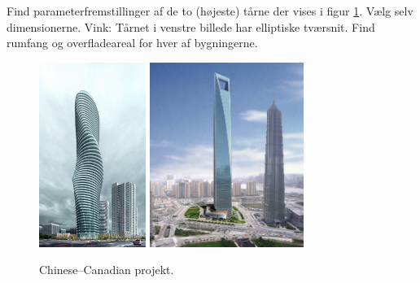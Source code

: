\begin{exercise}
Find parameterfremstillinger af de to (højeste) tårne der vises i figur \ref{figChinaCanada}.
Vælg selv dimensionerne. Vink: Tårnet i venstre billede har elliptiske tværsnit.
Find rumfang og overfladeareal for hver af bygningerne.
\end{exercise}

\begin{figure}[h]
\centerline{\includegraphics[height=60mm]{FIGS/ChinaCanadaMAD_tower_03} \includegraphics[height=60mm]{FIGS/CutOffTower}}
\begin{center}
\caption{\small{Chinese--Canadian projekt.}}
\label{figChinaCanada}
\end{center}
\end{figure}


















